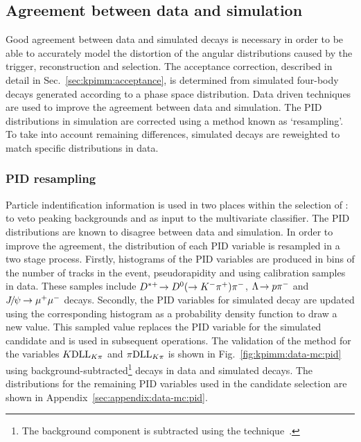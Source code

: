 \subsection{Agreement between data and simulation}
\label{sec:kpimm:data-mc}

Good agreement between data and simulated decays is necessary in order to be able to accurately model the distortion of the angular distributions caused by the trigger, reconstruction and selection. The acceptance correction, described in detail in Sec.~\ref{sec:kpimm:acceptance}, is determined from simulated four-body \BdToKpimm decays generated according to a phase space distribution. Data driven techniques are used to improve the agreement between data and simulation. The PID distributions in simulation are corrected using a method known as `resampling'. To take into account remaining differences, simulated decays are reweighted to match specific distributions in data.

\subsubsection{PID resampling}
\label{sec:kpimm:data-mc:resample}

Particle indentification information is used in two places within the selection of \BdToKpimm: to veto peaking backgrounds and as input to the multivariate classifier. The PID distributions are known to disagree between data and simulation. In order to improve the agreement, the distribution of each PID variable is resampled in a two stage process. Firstly, histograms of the PID variables are produced in bins of the number of tracks in the event, pseudorapidity and \pt using calibration samples in data. These samples include ${{D}^{*+}}\!\rightarrow {\ensuremath{{D}^0}}(\rightarrow{\ensuremath{{K}^-}}{\ensuremath{{\pi}^+}}){{\pi}^-}$, ${\Lambda}\!\rightarrow {\ensuremath{p}}{\ensuremath{{\pi}^-}}$ and ${{J\mskip -3mu/\mskip -2mu\psi\mskip 2mu}}\!\rightarrow {\ensuremath{\mu^+\mu^-}}$ decays. Secondly, the PID variables for simulated decay are updated using the corresponding histogram as a probability density function to draw a new value. This sampled value replaces the PID variable for the simulated candidate and is used in subsequent operations. The validation of the method for the variables ${K}\mathrm{DLL}_{{K}{\pi}}$ and ${\pi}\mathrm{DLL}_{{K}{\pi}}$ is shown in Fig.~\ref{fig:kpimm:data-mc:pid} using background-subtracted\footnote{The background component is subtracted using the \sPlot technique~\cite{splot}.} \BdToJPsiKst decays in data and simulated \BdToJPsiKst decays. The distributions for the remaining PID variables used in the candidate selection are shown in Appendix~\ref{sec:appendix:data-mc:pid}.

